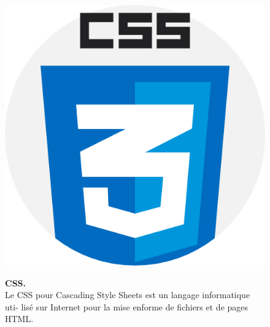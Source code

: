 \begin{figure}[H]
    \centering
    \begin{minipage}[c]{0.3\textwidth}
        \includegraphics[width=\linewidth]{projet/images/diagramme de sequance/CSS3.png}
    \end{minipage}
    \hspace{1cm}
    \begin{minipage}[c]{0.6\textwidth}
        \textbf{CSS.}\\[0.5em]
      Le CSS pour Cascading Style Sheets est un langage informatique uti-
lisé sur Internet pour la mise enforme de fichiers et de pages HTML.\cite{ref10}
    \end{minipage}
\end{figure}

\vspace{0.5cm}

